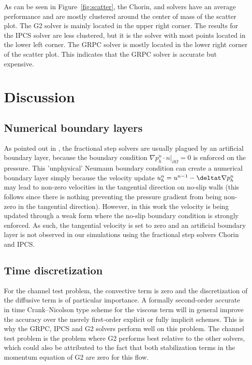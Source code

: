 As can be seen in Figure~\ref{fig:scatter}, the Chorin,  and
 solvers have an average performance and are mostly clustered
around the center of mass of the scatter plot. The G2 solver is mainly
located in the upper right corner. The results for the IPCS solver are
less clustered, but it is the solver with most points located in the
lower left corner. The GRPC solver is mostly located in the lower
right corner of the scatter plot. This indicates that the GRPC solver
is accurate but expensive.

\section{Discussion}
\label{Discussion}

\subsection{Numerical boundary layers}

As pointed out in \citet{GuermondMinevShen2006}, the fractional step
solvers are usually plagued by an artificial boundary layer, because
the boundary condition $ \nabla p^n_h \cdot n |_{\partial\Omega}=0$ is
enforced on the pressure. This 'unphysical' Neumann boundary condition
can create a numerical boundary layer simply because the velocity
update $u^{n}_h=u^{n-1}-\deltat\nabla p^n_h$ may lead to non-zero
velocities in the tangential direction on no-slip walls (this follows
since there is nothing preventing the pressure gradient from being
non-zero in the tangential direction). However, in this work the
velocity is being updated through a weak form where the no-slip
boundary condition is strongly enforced. As such, the tangential
velocity is set to zero and an artificial boundary layer is not
observed in our simulations using the fractional step solvers Chorin
and IPCS.

\subsection{Time discretization}

For the channel test problem, the convective term is zero and the
discretization of the diffusive term is of particular importance. A
formally second-order accurate in time Crank--Nicolson type scheme for
the viscous term will in general improve the accuracy over the merely
first-order explicit or fully implicit schemes. This is why the GRPC,
IPCS and G2 solvers perform well on this problem. The channel test
problem is the problem where G2 performs best relative to the other
solvers, which could also be attributed to the fact that both
stabilization terms in the momentum equation of G2 are zero for this
flow.

